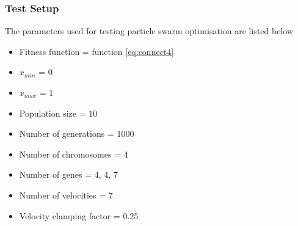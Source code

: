 \subsubsection{Test Setup}
The parameters used for testing particle swarm optimisation are listed below
\begin{itemize}
  \item{Fitness function = function \ref{eq:connect4}}
  \item{$x_{min}$ = 0}
  \item{$x_{max}$ = 1}
  \item{Population size = 10}
  \item{Number of generations = 1000}
  \item{Number of chromosomes = 4}
  \item{Number of genes = 4, 4, 7}
  \item{Number of velocities = 7}
  \item{Velocity clamping factor = 0.25}
\end{itemize}

